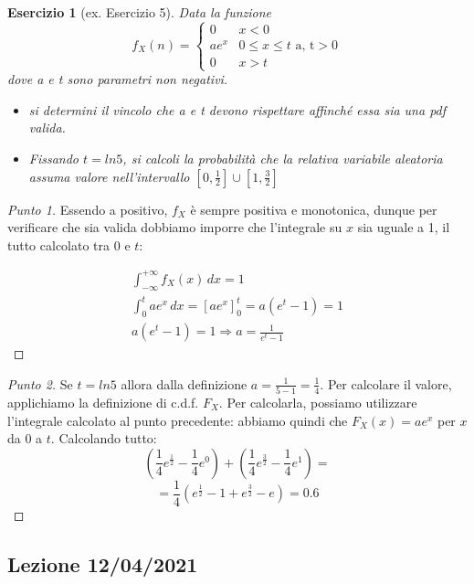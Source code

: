 \documentclass[12pt]{article}
\newtheorem{theorem}{Esercizio}
\renewcommand\qedsymbol{$\square$}
\begin{document}
\begin{theorem}[ex. Esercizio 5]
	Data la funzione
	\[
		f_X(n) = \begin{cases} 0 & x < 0 \\ a e^x & 0 \le x \le t \mbox{   a, t} > 0 \\ 0 & x > t \end{cases}
    \]
	dove a e t sono parametri non negativi.
	\begin{itemize}
		\item si determini il vincolo che a e t devono rispettare affinché essa sia una pdf valida.
		\item Fissando $t = ln 5$, si calcoli la probabilità che la relativa variabile aleatoria assuma valore nell’intervallo $[0, \frac{1}{2}] \cup [1, \frac{3}{2}]$
	\end{itemize}
\end{theorem}

\renewcommand\qedsymbol{$\square$}

\begin{proof}[Punto 1]
	Essendo a positivo, $f_X$ è sempre positiva e monotonica, dunque per verificare che sia valida dobbiamo imporre che l’integrale su $x$ sia uguale a 1, il tutto calcolato tra $0$ e $t$:
	
	\begin{gather*}
		\int_{-\infty}^{+\infty} f_X(x) \,dx = 1 \\
		\int_{0}^{t} a e^x \,dx = [a e^x]^t_0 = a(e^t - 1) = 1 \\
		a(e^t - 1) = 1 \Longrightarrow a = \frac{1}{e^t - 1}
	\end{gather*}
\end{proof}

\renewcommand\qedsymbol{$\blacksquare$}

\begin{proof}[Punto 2]
	Se $t = ln 5$ allora dalla definizione $a = \frac{1}{5-1} = \frac{1}{4}$. Per calcolare il valore, applichiamo la definizione di c.d.f. $F_X$. Per calcolarla, possiamo utilizzare l'integrale calcolato al punto precedente: abbiamo quindi che $F_X(x) = a e^x$ per $x$ da $0$ a $t$. Calcolando tutto:
	\[
		(\frac{1}{4} e^{\frac{1}{2}} - \frac{1}{4} e^{0}) + (\frac{1}{4} e^{\frac{3}{2}} - \frac{1}{4} e^{1}) =
    \]
	\[
		= \frac{1}{4} (e^{\frac{1}{2}} - 1 + e^{\frac{3}{2}} - e) = 0.6
    \]
\end{proof}

\subsection{Lezione 12/04/2021}
\end{document}
